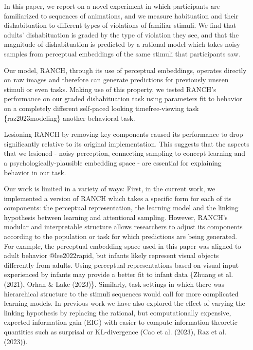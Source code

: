 \documentclass[10pt, letterpaper]{article}
\begin{document}
In this paper, we report on a novel experiment in which participants are
familiarized to sequences of animations, and we measure habituation and
their dishabituation to different types of violations of familiar
stimuli. We find that adults' dishabituation is graded by the type of
violation they see, and that the magnitude of dishabituation is
predicted by a rational model which takes noisy samples from perceptual
embeddings of the same stimuli that participants saw.

Our model, RANCH, through its use of perceptual embeddings, operates
directly on raw images and therefore can generate predictions for
previously unseen stimuli or even tasks. Making use of this property, we
tested RANCH's performance on our graded dishabituation task using
parameters fit to behavior on a completely different self-paced looking
timefree-viewing task \{raz2023modeling\} another behavioral task.

Lesioning RANCH by removing key components caused its performance to
drop significantly relative to its original implementation. This
suggests that the aspects that we lesioned - noisy perception,
connecting sampling to concept learning and a psychologically-plausible
embedding space - are essential for explaining behavior in our task.

Our work is limited in a variety of ways: First, in the current work, we
implemented a version of RANCH which takes a specific form for each of
its components: the perceptual representation, the learning model and
the linking hypothesis between learning and attentional sampling.
However, RANCH's modular and interpretable structure allows researchers
to adjust its components according to the population or task for which
predictions are being generated. For example, the perceptual embedding
space used in this paper was aligned to adult behavior @lee2022rapid,
but infants likely represent visual objects differently from adults.
Using perceptual representations based on visual input experienced by
infants may provide a better fit to infant data \{Zhuang et al. (2021),
Orhan \& Lake (2023)\}. Similarly, task settings in which there was
hierarchical structure to the stimuli sequences would call for more
complicated learning models. In previous work we have also explored the
effect of varying the linking hypothesis by replacing the rational, but
computationally expensive, expected information gain (EIG) with
easier-to-compute information-theoretic quantities such as surprisal or
KL-divergence (Cao et al. (2023), Raz et al. (2023)).
\end{document}
